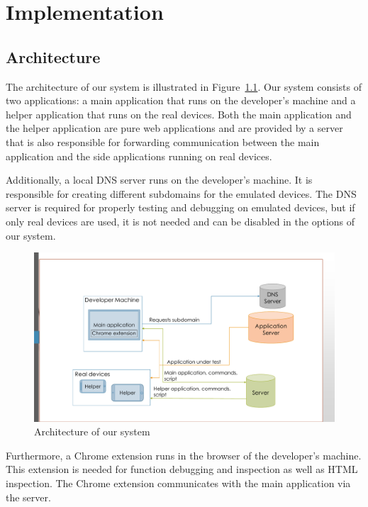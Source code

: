 \chapter{Implementation}

\section{Architecture}

The architecture of our system is illustrated in Figure~\ref{fig:architecture}. Our system consists of two applications: a main application that runs on the developer's machine and a helper application that runs on the real devices. Both the main application and the helper application are pure web applications and are provided by a server that is also responsible for forwarding communication between the main application and the side applications running on real devices.

Additionally, a local DNS server runs on the developer's machine. It is responsible for creating different subdomains for the emulated devices. The DNS server is required for properly testing and debugging on emulated devices, but if only real devices are used, it is not needed and can be disabled in the options of our system.

\begin{figure}[H]
  \centering
    \includegraphics[width=1.0\textwidth]{images/architecture_2.pdf}
	\caption[Architecture of our system]{Architecture of our system}
	\label{fig:architecture}
\end{figure}

Furthermore, a Chrome extension runs in the browser of the developer's machine. This extension is needed for function debugging and inspection as well as HTML inspection. The Chrome extension communicates with the main application via the server.

